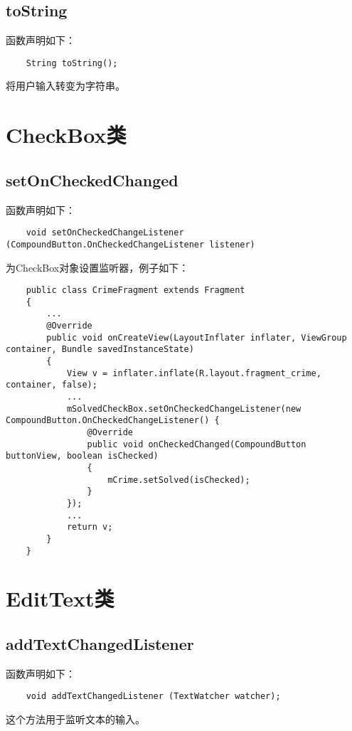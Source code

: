 \documentclass[a4paper,left=2.5cm,right=2.5cm,11pt]{article}
\begin{document}
\subsection{toString}
	函数声明如下：
	\begin{lstlisting}
	String toString();
	\end{lstlisting}

	将用户输入转变为字符串。

\section{CheckBox类}
\subsection{setOnCheckedChanged}
	函数声明如下：
	\begin{lstlisting}
	void setOnCheckedChangeListener (CompoundButton.OnCheckedChangeListener listener)
	\end{lstlisting}

	为CheckBox对象设置监听器，例子如下：
	\begin{lstlisting}
	public class CrimeFragment extends Fragment
	{
		...
		@Override
		public void onCreateView(LayoutInflater inflater, ViewGroup container, Bundle savedInstanceState)
		{
			View v = inflater.inflate(R.layout.fragment_crime, container, false);
			...
			mSolvedCheckBox.setOnCheckedChangeListener(new CompoundButton.OnCheckedChangeListener() {
				@Override
				public void onCheckedChanged(CompoundButton buttonView, boolean isChecked)
				{
					mCrime.setSolved(isChecked);
				}
			});
			...
			return v;
		}
	}
	\end{lstlisting}

\section{EditText类}
\subsection{addTextChangedListener}
	函数声明如下：
	\begin{lstlisting}
	void addTextChangedListener (TextWatcher watcher);
	\end{lstlisting}

	这个方法用于监听文本的输入。\par
\end{document}
